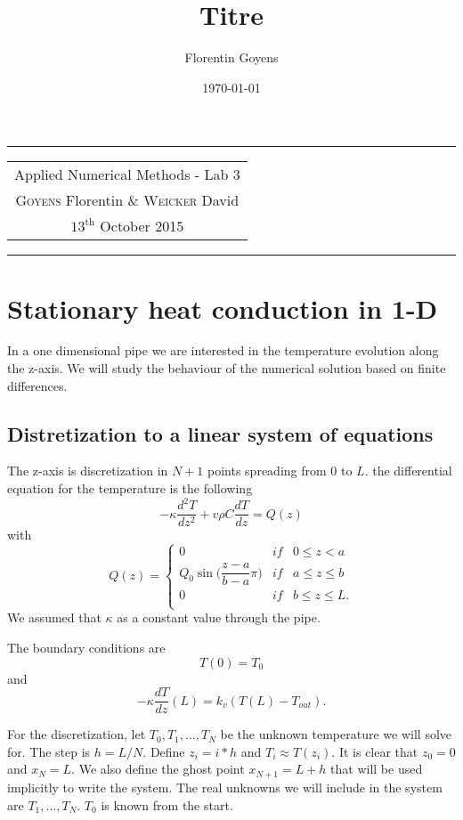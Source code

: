 \documentclass[11pt,a4paper]{report}
\title{Titre}
\author{Florentin Goyens}
\date{\today}
\begin{document}
\tabulinesep=1.2mm
\begin{center}
\hrule
\begin{tabular}{c}
\\[0.005cm]
\Large{Applied Numerical Methods - Lab 3}\\[0.3cm]
\textsc{Goyens} Florentin  \& \textsc{Weicker} David\\[0.2cm]
$\text{13}^{\text{th}}$ October 2015\\[0.2cm]
\end{tabular}
\hrule
\end{center}


\section{Stationary heat conduction in 1-D}

In a one dimensional pipe we are interested in the temperature evolution along the z-axis.  We will study the behaviour of the numerical solution based on finite differences.



\subsection*{Distretization to a linear system of equations}

The z-axis is discretization in $N+1$ points spreading from $0$ to $L$. the differential equation for the temperature is the following
$$-\kappa \dfrac{d^{2}T}{dz^{2}} +v\rho C\dfrac{dT}{dz}=Q(z)$$
with $$Q(z)= \left\{ \begin{array}{lll}
0 & if & 0\leq z <a\\
Q_{0}\sin \Big(\dfrac{z-a}{b-a}\pi \Big) & if & a \leq z \leq b\\
0 & if & b\leq z \leq L.\\
\end{array}\right.$$
We assumed that $\kappa$ as a constant value through the pipe.

The boundary conditions are
$$T(0)=T_{0}$$ and $$-\kappa \dfrac{dT}{dz}(L)=k_{v}(T(L)-T_{out}).$$

For the discretization, let $T_{0}, T_{1}, \dots, T_{N}$ be the unknown temperature we will solve for. The step is $h=L/N$. Define $z_{i}=i*h$ and $T_{i}\approx T(z_{i})$. It is clear that $z_0 =0$ and $x_N =L$. We also define the ghost point $x_{N+1}=L+h$ that will be used implicitly to write the system. The real unknowns we will include in the system are  $T_{1}, \dots, T_{N}$. $T_{0}$ is known from the start. 
\end{document}
